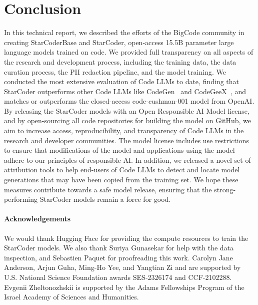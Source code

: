 \documentclass[10pt]{article} %
\begin{document}
\section{Conclusion}
In this technical report, we described the efforts of the BigCode community in creating StarCoderBase and StarCoder, open-access 15.5B parameter large language models trained on code. We provided full transparency on all aspects of the research and development process, including the training data, the data curation process, the PII redaction pipeline, and the model training.  We conducted the most extensive evaluation of Code LLMs to date, finding that StarCoder outperforms other Code LLMs like CodeGen~\citep{nijkamp:codegen} and CodeGeeX~\citep{qinkai:codegeex},  and matches or outperforms the closed-access code-cushman-001 model from OpenAI. By releasing the StarCoder models with an Open Responsible AI Model license, and by open-sourcing all code repositories for building the model on GitHub, we aim to increase access, reproducibility, and transparency of Code LLMs in the research and developer communities. The model license includes use restrictions to ensure that modifications of the model and applications using the model adhere to our principles of responsible AI. In addition, we released a novel set of attribution tools to help end-users of Code LLMs to detect and locate model generations that may have been copied from the training set. We hope these measures contribute towards a safe model release, ensuring that the strong-performing StarCoder models remain a force for good.


\paragraph{Acknowledgements} We would thank Hugging Face for providing the compute resources to train the StarCoder models.  We also thank Suriya Gunasekar for help with the data inspection, and Sebastien Paquet for proofreading this work.
Carolyn Jane Anderson, Arjun Guha, Ming-Ho Yee, and Yangtian Zi and  are supported by U.S. National Science Foundation awards SES-2326174 and CCF-2102288.  
Evgenii Zheltonozhskii is supported by the Adams Fellowships Program of the Israel Academy of Sciences and Humanities.




\clearpage
\appendix{}


\renewcommand\thefigure{\thesection.\arabic{figure}} 
\renewcommand\thetable{\thesection.\arabic{table}} 
\renewcommand\theequation{\thesection.\arabic{equation}} 
\renewcommand\thelstfloat{\thesection.\arabic{lstfloat}} 
\end{document}
